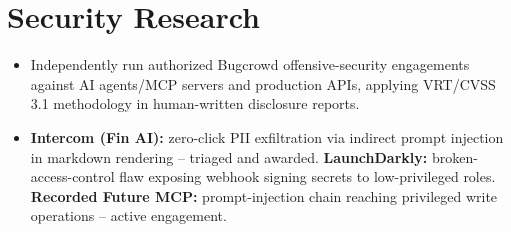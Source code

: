 \documentclass[letterpaper,9.5pt]{article}
\newcommand{\resumeItem}[1]{
  \item\small{#1 \vspace{-3.5pt}}
}
\newcommand{\resumeSubHeadingListStart}{\begin{itemize}[leftmargin=*, label={}]}
\newcommand{\resumeSubHeadingListEnd}{\end{itemize}}
\begin{document}
\section{Security Research}
\resumeSubHeadingListStart
  \resumeItem{Independently run authorized Bugcrowd offensive-security engagements against AI agents/MCP servers and production APIs, applying VRT/CVSS 3.1 methodology in human-written disclosure reports.}
  \resumeItem{\textbf{Intercom (Fin AI):} zero-click PII exfiltration via indirect prompt injection in markdown rendering -- triaged and awarded. \textbf{LaunchDarkly:} broken-access-control flaw exposing webhook signing secrets to low-privileged roles. \textbf{Recorded Future MCP:} prompt-injection chain reaching privileged write operations -- active engagement.}
\resumeSubHeadingListEnd
\end{document}
